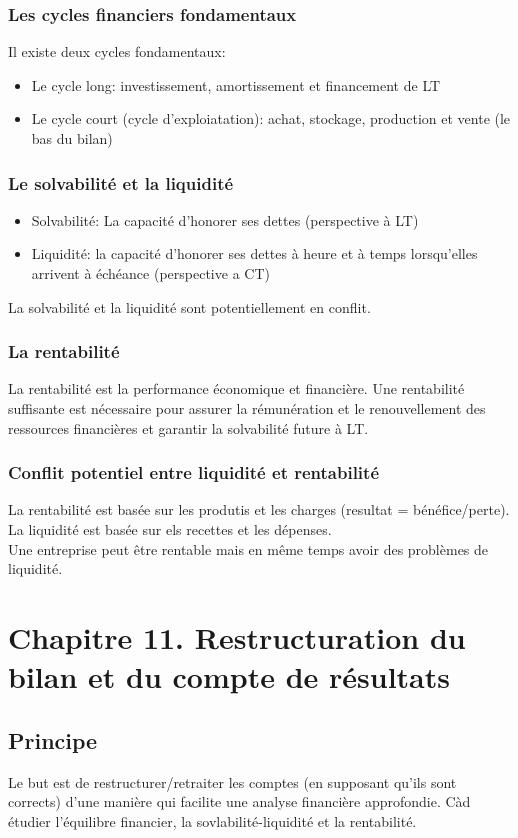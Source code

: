 \documentclass{article}
\begin{document}
\subsubsection*{Les cycles financiers fondamentaux}
Il existe deux cycles fondamentaux:
\begin{itemize}
    \item Le cycle long: investissement, amortissement et financement de LT
    \item Le cycle court (cycle d'exploiatation): achat, stockage, production et vente (le bas du bilan)
\end{itemize}

\subsubsection*{Le solvabilité et la liquidité}
\begin{itemize}
    \item Solvabilité: La capacité d'honorer ses dettes (perspective à LT)
    \item Liquidité: la capacité d'honorer ses dettes à heure et à temps lorsqu'elles arrivent à échéance (perspective a CT)
\end{itemize}
La solvabilité et la liquidité sont potentiellement en conflit. 

\subsubsection*{La rentabilité}
La rentabilité est la performance économique et financière. Une rentabilité suffisante est nécessaire pour assurer la rémunération et le renouvellement des ressources financières et garantir la solvabilité future à LT.

\subsubsection*{Conflit potentiel entre liquidité et rentabilité}
La rentabilité est basée sur les produtis et les charges (resultat = bénéfice/perte). La liquidité est basée sur els recettes et les dépenses. \\
Une entreprise peut être rentable mais en même temps avoir des problèmes de liquidité.

\section*{Chapitre 11. Restructuration du bilan et du compte de résultats}
\subsection*{Principe}
Le but est de restructurer/retraiter les comptes (en supposant qu'ils sont corrects) d'une manière qui facilite une analyse financière approfondie. Càd étudier l'équilibre financier, la sovlabilité-liquidité et la rentabilité.
\end{document}
